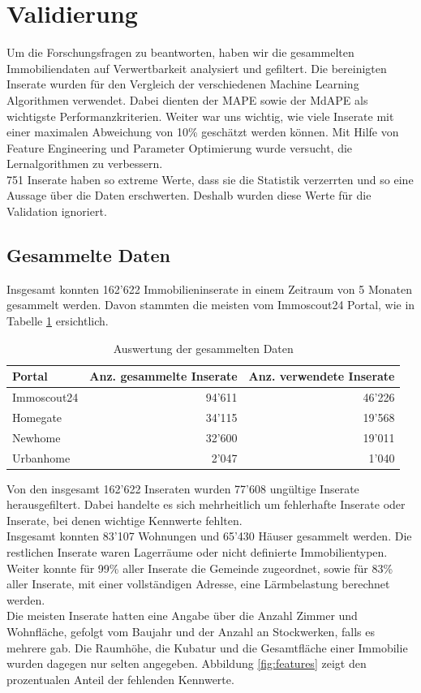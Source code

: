\section{Validierung}
Um die Forschungsfragen zu beantworten, haben wir die gesammelten Immobiliendaten auf Verwertbarkeit analysiert und gefiltert. Die bereinigten Inserate wurden für den Vergleich der verschiedenen Machine Learning Algorithmen verwendet. Dabei dienten der MAPE sowie der MdAPE als wichtigste Performanzkriterien. Weiter war uns wichtig, wie viele Inserate mit einer maximalen Abweichung von 10\% geschätzt werden können. Mit Hilfe von Feature Engineering und Parameter Optimierung wurde versucht, die Lernalgorithmen zu verbessern.\\
751 Inserate haben so extreme Werte, dass sie die Statistik verzerrten und so eine Aussage über die Daten erschwerten. Deshalb wurden diese Werte für die Validation ignoriert.

\subsection{Gesammelte Daten}
Insgesamt konnten 162'622 Immobilieninserate in einem Zeitraum von 5 Monaten gesammelt werden. Davon stammten die meisten vom Immoscout24 Portal, wie in Tabelle \ref{tab:crawled_data} ersichtlich.

\begin{table}[ht]
\centering
{}
\begin{tabular}{@{}lrr@{}}
\toprule
Portal &  Anz. gesammelte Inserate & Anz. verwendete Inserate \\
\midrule
Immoscout24 & 94'611 & 46'226\\
Homegate & 34'115 & 19'568\\
Newhome & 32'600 & 19'011\\
Urbanhome & 2'047 & 1'040\\
\bottomrule
\end{tabular}
\caption{Auswertung der gesammelten Daten}
\label{tab:crawled_data}
\end{table}

Von den insgesamt 162'622 Inseraten wurden 77’608 ungültige Inserate herausgefiltert.
Dabei handelte es sich mehrheitlich um fehlerhafte Inserate oder Inserate, bei denen wichtige Kennwerte fehlten.\\
Insgesamt konnten 83’107 Wohnungen und 65’430 Häuser gesammelt werden. Die restlichen Inserate waren Lagerräume oder nicht definierte Immobilien\-typen.\\
Weiter konnte für 99\% aller Inserate die Gemeinde zugeordnet, sowie für 83\% aller Inserate, mit einer vollständigen Adresse, eine Lärmbelastung berechnet werden.\\
Die meisten Inserate hatten eine Angabe über die Anzahl Zimmer und Wohnfläche, gefolgt vom Baujahr und der Anzahl an Stockwerken, falls es mehrere gab. Die Raumhöhe, die Kubatur und die Gesamtfläche einer Immobilie wurden dagegen nur selten angegeben. Abbildung \ref{fig:features} zeigt den prozentualen Anteil der fehlenden Kennwerte.

